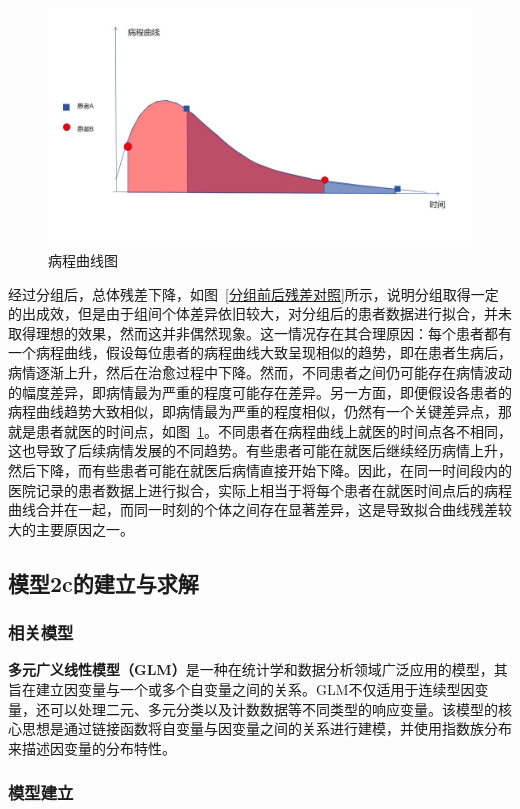 \documentclass[bwprint]{gmcmthesis}
\begin{document}
\begin{figure}[!h]
\centering
\includegraphics[width=.7\textwidth]{figures/病程曲线.jpg}
\caption{病程曲线图}
\label{病程曲线}
\end{figure}

经过分组后，总体残差下降，如图~\ref{分组前后残差对照}所示，说明分组取得一定的出成效，但是由于组间个体差异依旧较大，对分组后的患者数据进行拟合，并未取得理想的效果，然而这并非偶然现象。这一情况存在其合理原因：每个患者都有一个病程曲线，假设每位患者的病程曲线大致呈现相似的趋势，即在患者生病后，病情逐渐上升，然后在治愈过程中下降。然而，不同患者之间仍可能存在病情波动的幅度差异，即病情最为严重的程度可能存在差异。另一方面，即便假设各患者的病程曲线趋势大致相似，即病情最为严重的程度相似，仍然有一个关键差异点，那就是患者就医的时间点，如图~\ref{病程曲线}。不同患者在病程曲线上就医的时间点各不相同，这也导致了后续病情发展的不同趋势。有些患者可能在就医后继续经历病情上升，然后下降，而有些患者可能在就医后病情直接开始下降。因此，在同一时间段内的医院记录的患者数据上进行拟合，实际上相当于将每个患者在就医时间点后的病程曲线合并在一起，而同一时刻的个体之间存在显著差异，这是导致拟合曲线残差较大的主要原因之一。


\subsection{模型2c的建立与求解}

\subsubsection{相关模型}

\textbf{多元广义线性模型（GLM）}\cite{GLM}是一种在统计学和数据分析领域广泛应用的模型，其旨在建立因变量与一个或多个自变量之间的关系。GLM不仅适用于连续型因变量，还可以处理二元、多元分类以及计数数据等不同类型的响应变量。该模型的核心思想是通过链接函数将自变量与因变量之间的关系进行建模，并使用指数族分布来描述因变量的分布特性。

\subsubsection{模型建立}
\end{document}
